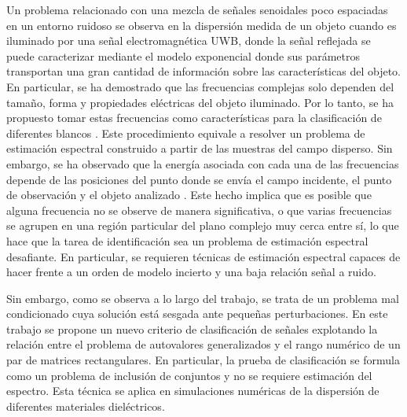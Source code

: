 Un problema relacionado con una mezcla de señales senoidales poco espaciadas en un entorno ruidoso se observa en la dispersión medida de un objeto cuando es iluminado por una señal electromagnética UWB, donde la señal reflejada se puede caracterizar mediante el modelo exponencial \cite{Baum1971} donde sus parámetros transportan una gran cantidad de información sobre las características del objeto. En particular, se ha demostrado que las frecuencias complejas solo dependen del tamaño, forma y propiedades eléctricas del objeto iluminado. Por lo tanto, se ha propuesto tomar estas frecuencias como características para la clasificación de diferentes blancos \cite{Knochel2005, Bannis2014, LAUNAY2013, Altieri2020}.  Este procedimiento equivale a resolver un problema de estimación espectral construido a partir de las muestras del campo disperso. Sin embargo, se ha observado que la energía asociada con cada una de las frecuencias depende de las posiciones del punto donde se envía el campo incidente, el punto de observación y el objeto analizado \cite{Baum1976}. Este hecho implica que es posible que alguna frecuencia no se observe de manera significativa, o que varias frecuencias se agrupen en una región particular del plano complejo muy cerca entre sí, lo que hace que la tarea de identificación sea un problema de estimación espectral desafiante. En particular, se requieren técnicas de estimación espectral capaces de hacer frente a un orden de modelo incierto y una baja relación señal a ruido. 

Sin embargo, como se observa a lo largo del trabajo, se trata de un problema mal condicionado cuya solución está sesgada ante pequeñas perturbaciones. En este trabajo se propone un nuevo criterio de clasificación de señales explotando la relación entre el problema de autovalores generalizados y el rango numérico \cite{Chorianopoulos2009} de un par de matrices rectangulares. En particular, la prueba de clasificación se formula como un problema de inclusión de conjuntos y no se requiere estimación del espectro. Esta técnica se aplica en simulaciones numéricas de la dispersión de diferentes materiales dieléctricos.



